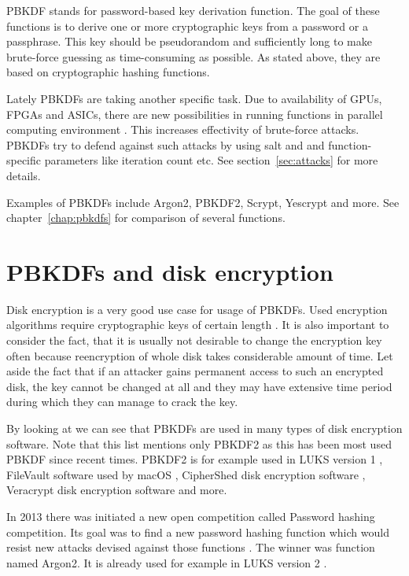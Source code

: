\documentclass[nolof]{fithesis3}
\begin{document}
PBKDF stands for password-based key derivation function. The goal of these functions is to derive one or more cryptographic keys from a password or a passphrase. This key should be pseudorandom and sufficiently long to make brute-force guessing as time-consuming as possible. As stated above, they are based on cryptographic hashing functions.

Lately PBKDFs are taking another specific task. Due to availability of GPUs, FPGAs and ASICs, there are  new possibilities in running functions in parallel computing environment \parencite[see][chapter 4]{mosnacek}. This increases effectivity of brute-force attacks. PBKDFs try to defend against such attacks by using salt and and function-specific parameters like iteration count etc. See section~\ref{sec:attacks} for more details.

Examples of PBKDFs include Argon2, PBKDF2, Scrypt, Yescrypt and more. See chapter~\ref{chap:pbkdfs} for comparison of several functions.

\section{PBKDFs and disk encryption}
Disk encryption is a very good use case for usage of PBKDFs. Used encryption algorithms require cryptographic keys of certain length \parencite{veracrypt}. It is also important to consider the fact, that it is usually not desirable to change the encryption key often because reencryption of whole disk takes considerable amount of time. Let aside the fact that if an attacker gains permanent access to such an encrypted disk, the key cannot be changed at all and they may have extensive time period during which they can manage to crack the key. 

By looking at \parencite{pbkdf2usage} we can see that PBKDFs are used in many types of disk encryption software. Note that this list mentions only PBKDF2 as this has been most used PBKDF since recent times. PBKDF2 is for example used in LUKS version 1 \parencite{luks1}, FileVault software used by macOS \parencite{filevault}, CipherShed disk encryption software \parencite{ciphershed}, Veracrypt disk encryption software \parencite{veracrypt} and more.

In 2013 there was initiated a new open competition called Password hashing competition. Its goal was to find a new password hashing function which would resist new attacks devised against those functions \parencite{phc}. The winner was function named Argon2. It is already used for example in LUKS version 2 \parencite{luks2}.
\end{document}
